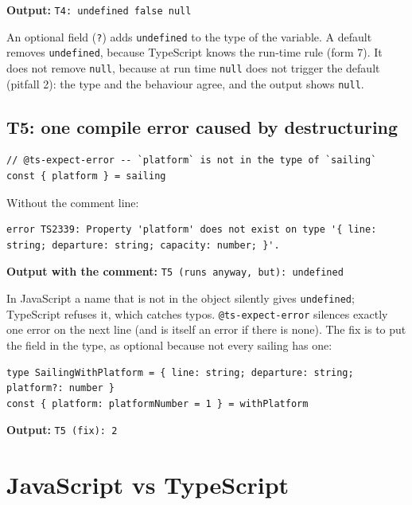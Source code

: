 \documentclass[
  10pt,
]{article}
\begin{document}
\textbf{Output:} \texttt{T4:\allowbreak{} undefined false null}

An optional field (\texttt{?}) adds \texttt{undefined} to the type of
the variable. A default removes \texttt{undefined}, because TypeScript
knows the run-time rule (form 7). It does not remove \texttt{null},
because at run time \texttt{null} does not trigger the default (pitfall
2): the type and the behaviour agree, and the output shows
\texttt{null}.

\hypertarget{t5-one-compile-error-caused-by-destructuring}{%
\subsection{T5: one compile error caused by
destructuring}\label{t5-one-compile-error-caused-by-destructuring}}

\begin{verbatim}
// @ts-expect-error -- `platform` is not in the type of `sailing`
const { platform } = sailing
\end{verbatim}

Without the comment line:

\begin{verbatim}
error TS2339: Property 'platform' does not exist on type '{ line: string; departure: string; capacity: number; }'.
\end{verbatim}

\textbf{Output with the comment:}
\texttt{T5 (\allowbreak{}runs anyway,\allowbreak{} but):\allowbreak{} undefined}

In JavaScript a name that is not in the object silently gives
\texttt{undefined}; TypeScript refuses it, which catches typos.
\texttt{@ts-expect-error} silences exactly one error on the next line
(and is itself an error if there is none). The fix is to put the field
in the type, as optional because not every sailing has one:

\begin{verbatim}
type SailingWithPlatform = { line: string; departure: string; platform?: number }
const { platform: platformNumber = 1 } = withPlatform
\end{verbatim}

\textbf{Output:} \texttt{T5 (\allowbreak{}fix):\allowbreak{} 2}

\hypertarget{javascript-vs-typescript}{%
\section{JavaScript vs TypeScript}\label{javascript-vs-typescript}}
\end{document}
